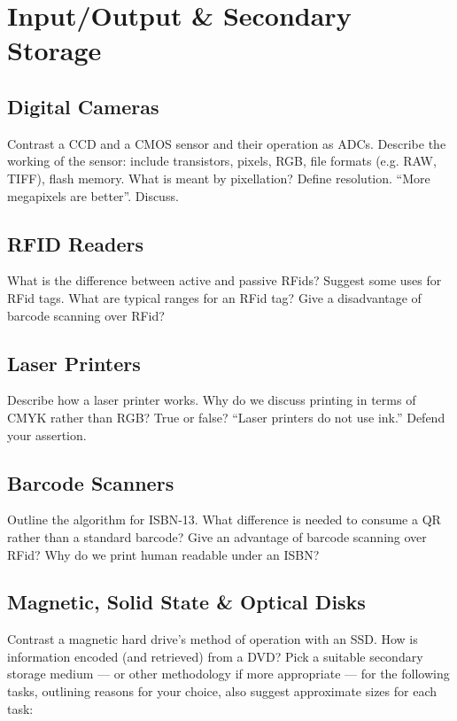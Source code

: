 \section{Input/Output \& Secondary Storage}
\begin{questions}
	\subsection{Digital Cameras}
	\question Contrast a CCD and a CMOS sensor and their operation as ADCs. 
	\question Describe the working of the sensor: include transistors, pixels, RGB, file formats (e.g. RAW, TIFF), flash memory. 
	\question What is meant by pixellation? 
	\question Define resolution. 
	\question ``More megapixels are better''. Discuss.  
	\subsection{RFID Readers}
	\question What is the difference between active and passive RFids?
	\question Suggest some uses for RFid tags. What are typical ranges for an RFid tag?  
	\question Give a disadvantage of barcode scanning over RFid? 
	\subsection{Laser Printers}
	\question Describe how a laser printer works. 
	\question Why do we discuss printing in terms of CMYK rather than RGB?
	\question True or false? ``Laser printers do not use ink.'' Defend your assertion. 
	\subsection{Barcode Scanners}
	\question Outline the algorithm for ISBN-13. 
	\question What difference is needed to consume a QR rather than a standard barcode? 
	\question Give an advantage of barcode scanning over RFid? 
	\question Why do we print human readable under an ISBN?  
	\subsection{Magnetic, Solid State \& Optical Disks}
	\question Contrast a magnetic hard drive's method of operation with an SSD. 
	\question How is information encoded (and retrieved) from a DVD? 
	\question Pick a suitable secondary storage medium --- or other methodology if more appropriate --- for the following tasks, outlining reasons for your choice, also suggest approximate sizes for each task: 
	\begin{parts}

\end{parts}
\end{questions}
